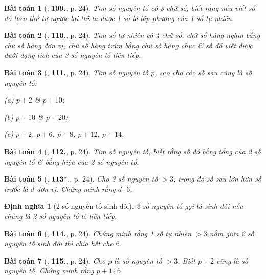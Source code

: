 \documentclass{article}
\numberwithin{equation}{section}
\newtheorem{dinhnghia}{Định nghĩa}[section]
\newtheorem{baitoan}{Bài toán}[section]
\begin{document}
\begin{baitoan}[\cite{Binh_Toan_6_tap_1}, \textbf{109.}, p. 24]
	Tìm số nguyên tố có 3 chữ số, biết rằng nếu viết số đó theo thứ tự ngược lại thì ta được 1 số là lập phương của 1 số tự nhiên.
\end{baitoan}

\begin{baitoan}[\cite{Binh_Toan_6_tap_1}, \textbf{110.}, p. 24]
	Tìm số tự nhiên có 4 chữ số, chữ số hàng nghìn bằng chữ số hàng đơn vị, chữ số hàng trăm bằng chữ số hàng chục \& số đó viết được dưới dạng tích của 3 số nguyên tố liên tiếp.
\end{baitoan}

\begin{baitoan}[\cite{Binh_Toan_6_tap_1}, \textbf{111.}, p. 24]
	Tìm số nguyên tố $p$, sao cho các số sau cũng là số nguyên tố:
	\begin{enumerate*}
		\item[(a)] $p + 2$ \& $p + 10$;
		\item[(b)] $p + 10$ \& $p + 20$;
		\item[(c)] $p + 2$, $p + 6$, $p + 8$, $p + 12$, $p + 14$.
	\end{enumerate*}
\end{baitoan}

\begin{baitoan}[\cite{Binh_Toan_6_tap_1}, \textbf{112.}, p. 24]
	Tìm số nguyên tố, biết rằng số đó bằng tổng của 2 số nguyên tố \& bằng hiệu của 2 số nguyên tố.
\end{baitoan}

\begin{baitoan}[\cite{Binh_Toan_6_tap_1}, $\bf 113^\star.$, p. 24]
	Cho 3 số nguyên tố $> 3$, trong đó số sau lớn hơn số trước là $d$ đơn vị. Chứng minh rằng $d\ \vdots\ 6$.
\end{baitoan}

\begin{dinhnghia}[2 số nguyên tố sinh đôi]
	2 số nguyên tố gọi là \emph{sinh đôi} nếu chúng là 2 số nguyên tố lẻ liên tiếp.
\end{dinhnghia}

\begin{baitoan}[\cite{Binh_Toan_6_tap_1}, \textbf{114.}, p. 24]
	Chứng minh rằng 1 số tự nhiên $> 3$ nằm giữa 2 số nguyên tố sinh đôi thì chia hết cho $6$.
\end{baitoan}

\begin{baitoan}[\cite{Binh_Toan_6_tap_1}, \textbf{115.}, p. 24]
	Cho $p$ là số nguyên tố $> 3$. Biết $p + 2$ cũng là số nguyên tố. Chứng minh rằng $p + 1\ \vdots\ 6$.
\end{baitoan}
\end{document}
